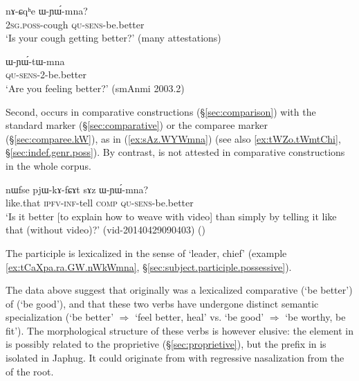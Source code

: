 \begin{exe}
\ex \label{ex:nACqhe.WYWmna}
\gll nɤ-ɕqʰe ɯ-ɲɯ́-mna? \\
\textsc{2sg}.\textsc{poss}-cough \textsc{qu}-\textsc{sens}-be.better \\
\glt `Is your cough getting better?' (many attestations)
\end{exe}

\begin{exe}
\ex \label{ex:WYWtWmna}
\gll ɯ-ɲɯ́-tɯ-mna \\
\textsc{qu}-\textsc{sens}-2-be.better \\
\glt `Are you feeling better?' (smAnmi 2003.2)
\end{exe}

Second,  occurs in comparative constructions (§\ref{sec:comparison}) with the standard marker  (§\ref{sec:comparative}) or the comparee marker  (§\ref{sec:comparee.kW}), as in (\ref{ex:sAz.WYWmna}) (see also \ref{ex:tWZo.tWmtChi}, §\ref{sec:indef.genr.poss}). By contrast,  is not attested in comparative constructions in the whole corpus.

\begin{exe}
\ex \label{ex:sAz.WYWmna}
\gll  nɯfse pjɯ-kɤ-fɕɤt sɤz ɯ-ɲɯ́-mna? \\
like.that \textsc{ipfv}-\textsc{inf}-tell \textsc{comp} \textsc{qu}-\textsc{sens}-be.better \\
\glt `Is it better [to explain how to weave with video] than simply by telling it like that (without video)?' (vid-20140429090403) ()
\end{exe}

The participle  is lexicalized in the sense of `leader, chief' (example \ref{ex:tCaXpa.ra.GW.nWkWmna}, §\ref{sec:subject.participle.possessive}).

The data above suggest that  originally was a lexicalized comparative (`be better') of  (`be good'), and that these two verbs have undergone distinct semantic specialization (`be better' $\Rightarrow$ `feel better, heal' vs. `be good' $\Rightarrow$ `be worthy, be fit'). The morphological structure of these verbs is however elusive: the  element in  is possibly related to the proprietive  (§\ref{sec:proprietive}), but the  prefix in  is isolated in Japhug. It could originate from  with regressive nasalization from the  of the root.

